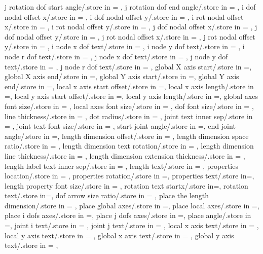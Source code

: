 {  j rotation dof start angle/.store in = \jrotdofstartangle,
  j rotation dof end angle/.store in = \jrotdofendangle, 
  i dof nodal offset x/.store in = \idofnodaloffsetx,
  i dof nodal offset y/.store in = \idofnodaloffsety,
  i rot nodal offset x/.store in = \irotnodaloffsetx,
  i rot nodal offset y/.store in = \irotnodaloffsety,
  j dof nodal offset x/.store in = \jdofnodaloffsetx,
  j dof nodal offset y/.store in = \jdofnodaloffsety,
  j rot nodal offset x/.store in = \jrotnodaloffsetx,
  j rot nodal offset y/.store in = \jrotnodaloffsety,
  i node x dof text/.store in = \inodexdoftext,
  i node y dof text/.store in = \inodeydoftext,
  i node r dof text/.store in = \inoderdoftext,
  j node x dof text/.store in = \jnodexdoftext,
  j node y dof text/.store in = \jnodeydoftext,
  j node r dof text/.store in = \jnoderdoftext,
  global X axis start/.store in =\globalXstart,
  global X axis end/.store in =\globalXend,
  global Y axis start/.store in =\globalYstart,
  global Y axis end/.store in =\globalYend,
  local x axis start offset/.store in =\localxstartoffset,
  local x axis length/.store in =\localxlength,
  local y axis start offset/.store in =\localystartoffset,
  local y axis length/.store in =\localylength,
  global axes font size/.store in = \globalaxesfontsize,
  local axes font size/.store in = \localaxesfontsize,
  dof font size/.store in = \doffontsize,
  line thickness/.store in = \linethickness,
  dot radius/.store in = \dotradius,
  joint text inner sep/.store in = \jointinnersep,
  joint text font size/.store in = \jointtextfontsize,
  start joint angle/.store in =\startjointangle,
  end joint angle/.store in =\endjointangle,
  length dimension offset/.store in = \lengthdimoffset,
  length dimension space ratio/.store in = \lengthdimspaceratio,
  length dimension text rotation/.store in = \lengthlabelrotation,
  length dimension line thickness/.store in = \lengthdimlinethick,
  length dimension extension thickness/.store in = \lengthdimextthick,
  length label text inner sep/.store in = \lengthlabeltextinnersep,
  length text/.store in = \lengthtext,
  properties location/.store in = \propertyloc,
  properties rotation/.store in =\propertyrotation,
  properties text/.store in=\propertiestext,
  length property font size/.store in = \lengthpropfontsize,
  rotation text startx/.store in=\rotationanglex,
  rotation text/.store in=\rotationtext,
  dof arrow size ratio/.store in = \dofarrowsiz,
  place the length dimension/.store in = \placelengthdim,
  place global axes/.store in =\placeglobalaxes ,
  place local axes/.store in =\placelocalaxes ,
  place i dofs axes/.store in =\placeidofs ,
  place j dofs axes/.store in =\placejdofs  ,
  place angle/.store in =\placeangle,
  joint i text/.store in = \jointitext,
  joint j text/.store in = \jointjtext,
  local x axis text/.store in = \localxtext,
  local y axis text/.store in = \localytext,
  global x axis text/.store in = \globalxtext,
  global y axis text/.store in = \globalytext, }

